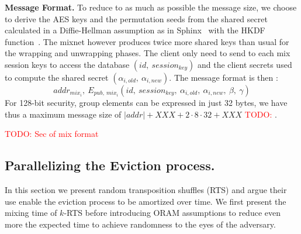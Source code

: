 \documentclass{llncs}
\newcommand{\todo}[1]{\textcolor{red}{TODO: #1}}
\begin{document}
\noindent\textbf{Message Format.}
To reduce to as much as possible the message size, we choose to derive the AES keys and the permutation seeds from the shared secret calculated in a Diffie-Hellman assumption as in Sphinx~\cite{XXXsphinx} with the HKDF function~\cite{XXXHKDF}. The mixnet however produces twice more shared keys than usual for the wrapping and unwrapping phases. \iffalse\\
Let $\kappa$ be the security parameter. We call $\mathcal{G}$ a prime order cyclic group satisfying the Decisional Diffie-Hellman Assumption. $\mathcal{G}^*$ is the set of non-identity elements of $\mathcal{G}$. The element $g$ is a generator of the group, and $q$ is the prime order of $\mathcal{G}$ with $q \approx 2^{2\kappa}$.\\
We suppose each mix owns a pair of keys ($\ priv_i \in \mathbb{Z}_{q}^*$, $pub_i=g^{priv_i}\in \mathcal{G}^*$). We assume the existence of a PKI that publishes a list of all ($mix_i$,\ $pub_i$) pair.
The client randomly chooses $x\in_\mathcal{R} \mathbb{Z}_q^*$ and sends to the mix $mix_i$ the element $\alpha_i=g^{x\cdot b_i}$ with $b_i$ a binding factors, the shared secret is then $s_i=pub_i^{x\cdot b_i}$.
\fi
The client only need to send to each mix session keys to access the database $(id,\ session_{key})$ and the client secrets used to compute the shared secret $( \alpha_{i,old},\ \alpha_{i,new} )$.
The message format is then : $$addr_{mix_i},\ E_{pub,\ mix_i}\left(id,\ session_{key},\ \alpha_{i,old},\ \alpha_{i,new},\ \beta,\ \gamma \right )$$ For 128-bit security, group elements can be expressed in just 32 bytes, we have thus a maximum message size of $|addr|+XXX + 2 \cdot 8 \cdot 32 + XXX$ \todo{}.

\todo{Sec of mix format}

\subsection{Parallelizing the Eviction process.}
In this section we present random transposition shuffles (RTS) and argue their use enable the eviction process to be amortized over time.
We first present the mixing time of $k$-RTS before introducing ORAM assumptions to reduce even more the expected time to achieve randomness to the eyes of the adversary.
\end{document}
